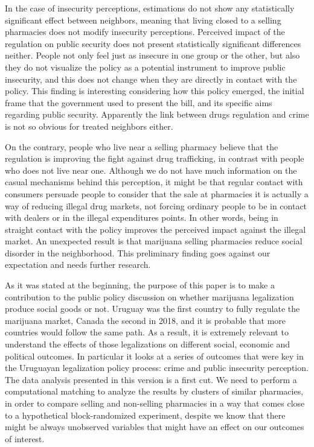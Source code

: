 \documentclass[11pt]{article}
\begin{document}
In the case of insecurity perceptions, estimations do not show any statistically significant effect between neighbors, meaning that living closed to a selling pharmacies does not modify insecurity perceptions. Perceived impact of the regulation on public security does not present statistically significant differences neither. People not only feel just as insecure in one group or the other, but also they do not visualize the policy as a potential instrument to improve public insecurity, and this does not change when they are directly in contact with the policy. This finding is interesting considering how this policy emerged, the initial frame that the government used to present the bill, and its specific aims regarding public security. Apparently the link between drugs regulation and crime is not so obvious for treated neighbors either.

On the contrary, people who live near a selling pharmacy believe that the regulation is improving the fight against drug trafficking, in contrast with people who does not live near one. Although we do not have much information on the casual mechanisms behind this perception, it might be that regular contact with consumers persuade people to consider that the sale at pharmacies it is actually a way of reducing illegal drug markets, not forcing ordinary people to be in contact with dealers or in the illegal expenditures points. In other words, being in straight contact with the policy improves the perceived impact against the illegal market. An unexpected result is that marijuana selling pharmacies reduce social disorder in the neighborhood. This preliminary finding goes against our expectation and needs further research.

As it was stated at the beginning, the purpose of this paper is to make a contribution to the public policy discussion on whether marijuana legalization produce social goods or not. Uruguay was the first country to fully regulate the marijuana market, Canada the second in 2018, and it is probable that more countries would follow the same path. As a result, it is extremely relevant to understand the effects of those legalizations on different social, economic and political outcomes. In particular it looks at a series of outcomes that were key in the Uruguayan legalization policy process: crime and public insecurity perception. The data analysis presented in this version is a first cut. We need to perform a computational matching to analyze the results by clusters of similar pharmacies, in order to compare selling and non-selling pharmacies in a way that comes close to a hypothetical block-randomized experiment, despite we know that there might be always unobserved variables that might have an effect on our outcomes of interest.
\end{document}
